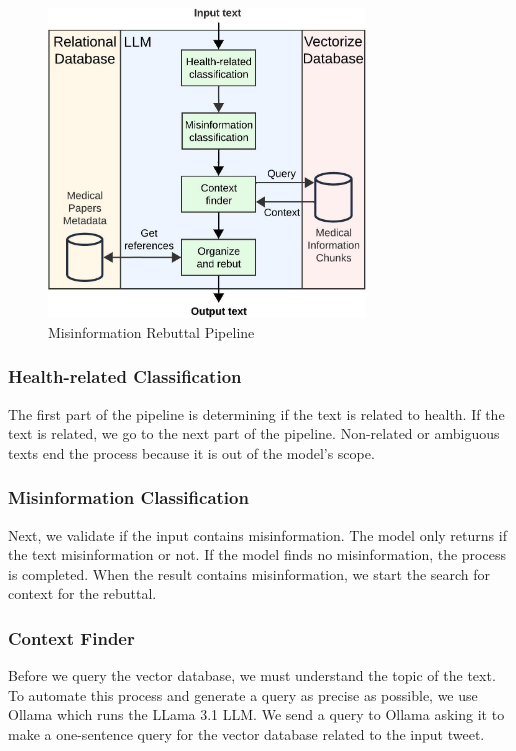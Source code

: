 \begin{figure}[!htb]
	\begin{center}
		\includegraphics[width=0.75\textwidth]{figures/LLM_Pipeline.jpeg} %
	\end{center}
	\caption{Misinformation Rebuttal Pipeline} %
	\label{fig:llm}
\end{figure}


\subsubsection{Health-related Classification}
The first part of the pipeline is determining if the text is related to health. If the text is related, we go to the next part of the pipeline. Non-related or ambiguous texts end the process because it is out of the model's scope. 

\subsubsection{Misinformation Classification}
Next, we validate if the input contains misinformation. The model  only returns if the text misinformation or not. If the model finds no misinformation, the process is completed. When the result contains misinformation, we start the search for context for the rebuttal.

\subsubsection{Context Finder}
Before we  query the vector database, we must understand the topic of the text. To automate this process and generate a query as precise as possible, we use Ollama \cite{ollama} which runs the LLama 3.1 LLM. We send a query to Ollama asking it to make a one-sentence query for the vector database related to the input tweet.

